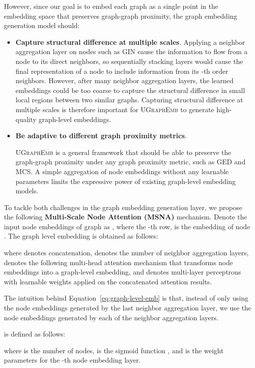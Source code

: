 \documentclass{article}
\newcommand{\model}{\textsc{UGraphEmb}\xspace}
\newcommand{\gin}{\textsc{GIN}\xspace}
\begin{document}
However, since our goal is to embed each graph as a single point in the embedding space that preserves graph-graph proximity,
the graph embedding generation model should:
\begin{itemize}
    \item \textbf{{Capture structural difference at multiple scales}}.
    Applying a neighbor aggregation layer on nodes such as \gin cause the information to flow from a node to its direct neighbors, so sequentially stacking  layers would cause the final representation of a node to include information from its -th order neighbors. 
However, after many neighbor aggregation layers, the learned embeddings could be too coarse to capture the structural difference in small local regions between two similar graphs.
Capturing structural difference at multiple scales is therefore important for \model to generate high-quality graph-level embeddings.
    
    \item \textbf{{Be adaptive to different graph proximity metrics}}.
    
    \model is a general framework that should be able to preserve the graph-graph proximity under any graph proximity metric, such as GED and MCS. A simple aggregation of node embeddings without any learnable parameters limits the expressive power of existing graph-level embedding models.
\end{itemize}

To tackle both challenges in the graph embedding generation layer, we propose the following \textbf{Multi-Scale Node Attention (MSNA)} mechanism. Denote the input node embeddings of graph  as , where the -th row,  is the embedding of node . The graph level embedding is obtained as follows:

where  denotes concatenation,  denotes the number of neighbor aggregation layers,  denotes the following multi-head attention mechanism that transforms node embeddings into a graph-level embedding, and  denotes multi-layer perceptrons with learnable weights  applied on the concatenated attention results. 

The intuition behind Equation~\ref{eq:graph-level-emb} is that, instead of only using the node embeddings generated by the last neighbor aggregation layer, we use the node embeddings generated by each of the  neighbor aggregation layers. 

 is defined as follows:

where  is the number of nodes,  is the sigmoid function , and  is the weight parameters for the -th node embedding layer. 
\end{document}
